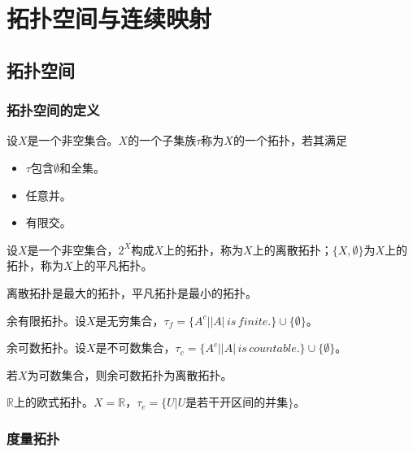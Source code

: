\section{拓扑空间与连续映射}

\subsection{拓扑空间}

\subsubsection{拓扑空间的定义}

\begin{definition}[拓扑]
    设$X$是一个非空集合。$X$的一个子集族$\tau$称为$X$的一个拓扑，若其满足
    \begin{itemize}
        \item $\tau$包含$\emptyset$和全集。
        \item 任意并。
        \item 有限交。
    \end{itemize}
\end{definition}

设$X$是一个非空集合，$2^X$构成$X$上的拓扑，称为$X$上的离散拓扑；$\{X,\emptyset\}$为$X$上的拓扑，称为$X$上的平凡拓扑。
\par
离散拓扑是最大的拓扑，平凡拓扑是最小的拓扑。
\begin{example}
    余有限拓扑。设$X$是无穷集合，$\tau_f=\{A^c \big| |A| \, is \, finite. \}\cup\{\emptyset\}$。
\end{example}

\begin{example}
    余可数拓扑。设$X$是不可数集合，$\tau_c=\{A^c\big| |A|\, is \, countable.\}\cup \{\emptyset\}$。
\end{example}

\begin{remark}
    若$X$为可数集合，则余可数拓扑为离散拓扑。
\end{remark}

\begin{example}
    $\mathbb{R}$上的欧式拓扑。$X=\mathbb{R}$，$\tau_e=\{U\big| U\text{是若干开区间的并集}\}$。
\end{example}

\subsubsection{度量拓扑}
\begin{definition}[度量]
    
\end{definition}

